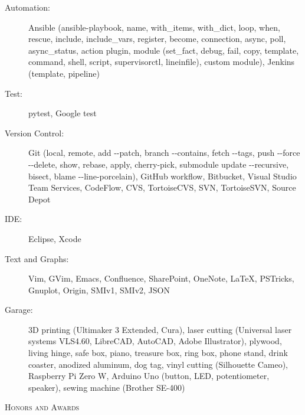 \documentclass[letterpaper,11pt]{article}
\newcommand{\resheading}[1]{{\noindent\large \colorbox{mygrey}{
\begin{minipage}{1.0\textwidth}{\textsc{#1 \vphantom{p\^{E}}}}\end{minipage}}}}
\begin{document}
\begin{description}
\item[Automation:] Ansible (ansible-playbook, name, with\_items, with\_dict, loop, when, rescue, include, include\_vars, register, become, connection,
async, poll, async\_status, action plugin,
module (set\_fact, debug, fail, copy, template, command, shell, script, supervisorctl, lineinfile), custom module),
Jenkins (template, pipeline)

\item[Test:] pytest, Google test

\item[Version Control:] Git (local, remote, add -{}-patch, branch -{}-contains,
fetch -{}-tags, push -{}-force -{}-delete, show, rebase, apply, cherry-pick, submodule update -{}-recursive, bisect, blame -{}-line-porcelain),
GitHub workflow, Bitbucket, Visual Studio Team Services,
CodeFlow, CVS, TortoiseCVS, SVN, TortoiseSVN, Source Depot

\item[IDE:] Eclipse, Xcode

\item[Text and Graphs:] Vim, GVim, Emacs, Confluence, SharePoint, OneNote, \LaTeX, PSTricks, Gnuplot, Origin, SMIv1, SMIv2, JSON

\item[Garage:] 3D printing (Ultimaker 3 Extended, Cura), laser cutting (Universal laser systems VLS4.60, LibreCAD, AutoCAD, Adobe Illustrator),
plywood, living hinge, safe box, piano, treasure box, ring box, phone stand, drink coaster, anodized aluminum, dog tag,
vinyl cutting (Silhouette Cameo), Raspberry Pi Zero W, Arduino Uno (button, LED, potentiometer, speaker), sewing machine (Brother SE-400)

\end{description}




\resheading{Honors and Awards}%
\end{document}

